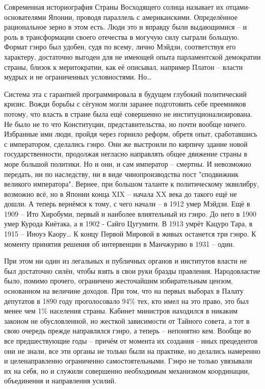 Современная историография Страны Восходящего солнца называет их отцами-основателями Японии, проводя параллель с американскими. Определённое рациональное зерно в этом есть. Люди это и вправду были выдающимися – и роль в трансформации своего отечества в могучую силу сыграли большую. Формат гэнро был удобен, судя по всему, лично Мэйдзи, соответствуя его характеру, достаточно выгоден для не имеющей опыта парламентской демократии страны, близок к меритократии, как её описывал, например Платон – власти мудрых и не ограниченных условностями. Но…

Система эта с гарантией программировала в будущем глубокий политический кризис. Вожди борьбы с сёгуном могли заранее подготовить себе преемников потому, что власть в стране была ещё совершенно не институционализирована. Не было не то что Конституции, представительства, но почти вообще ничего. Избранные ими люди, пройдя через горнило реформ, обретя опыт, сработавшись с императором, сделались гэнро. Они же выстроили по кирпичу здание новой государственности, продолжая негласно направлять общее движение страны в море большой политики. Но и они, и сам император – смертны. И невозможно передать, ни по наследству, ни в виде чинопроизводства пост "сподвижник великого императора". Вернее, при большом таланте к политическому эквилибру, возможно всё, но в Японии конца XIX – начала XX века до такого ещё не дошли. А теперь вернёмся к тому, с чего начали – в 1912 умер Мэйдзи. Ещё в 1909 – Ито Хиробуми, первый и наиболее влиятельный из гэнро. До него в 1900 умер Курода Киётака, а в 1902 - Сайго Цугумити. В 1913 умрёт Кацуро Тара, в 1915 – Иноуэ Каору… К концу Первой Мировой в живых останется три гэнро. К моменту принятия решения об интервенции в Манчжурию в 1931 – один.

При этом ни один из легальных и публичных органов и институтов власти не был достаточно силён, чтобы взять в свои руки бразды правления. Народовластие было, помимо прочего, ограничено жесточайшим избирательным цензом, основанном на величине доходов. При том, что на первых выборах в Палату депутатов в 1890 году проголосовало 94\% тех, кто имел на это право, это был менее чем 1\% населения страны. Кабинет министров находился в никаким законом не обусловленной, но жесткой зависимости от Тайного совета, а тот в свою очередь прежде направлялся гэнро, а теперь – непонятно кем. Вообще во все предшествующие годы – причём от момента их создания - иных прецедентов они не знали, все эти органы не только были на практике, но делались намеренно и целенаправленно ограниченно самостоятельными. Гэнро не только увязывали их на себя, но и служили совершенно необходимым механизмом координации, объединения и направления усилий.

